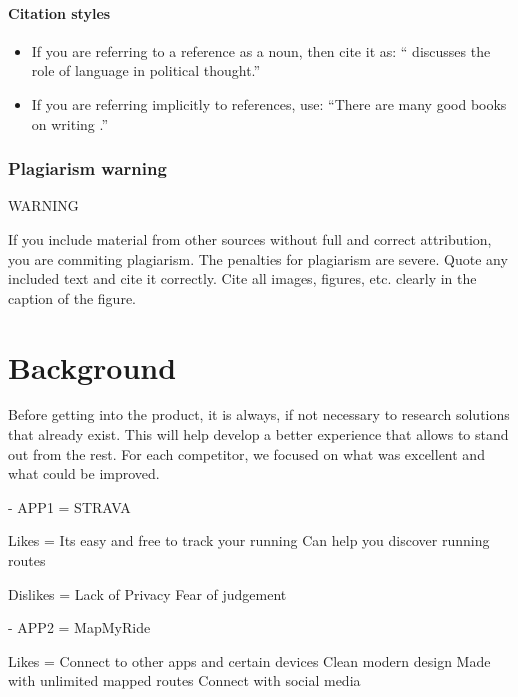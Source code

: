 \documentclass{l4proj}
\begin{document}
\subsubsection{Citation styles}

\begin{itemize}
\item If you are referring to a reference as a noun, then cite it as: ``\citet{Orw68} discusses the role of language in political thought.''
\item If you are referring implicitly to references, use: ``There are many good books on writing \citep{Orw68, Wil09, Pin15}.''
\end{itemize}
\subsection{Plagiarism warning}

\begin{highlight_title}{WARNING}
    
    If you include material from other sources without full and correct attribution, you are commiting plagiarism. The penalties for plagiarism are severe.
    Quote any included text and cite it correctly. Cite all images, figures, etc. clearly in the caption of the figure.
\end{highlight_title}


\chapter{Background}

 
Before getting into the product, it is always, if not necessary to research solutions that already exist. This will help develop a better experience that allows to stand out from the rest. For each competitor, we focused on what was excellent and what could be improved. 

- APP1 = STRAVA

Likes = Its easy and free to track your running
             Can help you discover running routes
 
Dislikes = Lack of Privacy
                  Fear of judgement

- APP2 = MapMyRide

Likes = Connect to other apps and certain devices 
             Clean modern design
             Made with unlimited mapped routes
             Connect with social media
 
\end{document}
